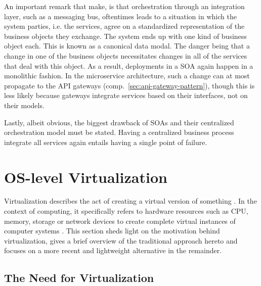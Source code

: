 An important remark that \citeauthor{cerny2018contextual} make, is that orchestration through an integration layer, such as a messaging bus, oftentimes leads to a situation in which the system parties, i.e. the services, agree on a standardized representation of the business objects they exchange. The system ends up with one kind of business object each. This is known as a canonical data modal. The danger being that a change in one of the business objects necessitates changes in all of the services that deal with this object. As a result, deployments in a \ac{SOA} again happen in a monolithic fashion. In the microservice architecture, such a change can at most propagate to the \acs{API} gateways (comp.~\autoref{sec:api-gateway-pattern}), though this is less likely because gateways integrate services based on their interfaces, not on their models.

Lastly, albeit obvious, the biggest drawback of \acp{SOA} and their centralized orchestration model must be stated. Having a centralized business process integrate all services again entails having a single point of failure.


\section{OS-level Virtualization}
\label{sec:os-level-virtualization}

Virtualization describes the act of creating a virtual version of something \cite[p.~2]{celesti2016exploring}. In the context of computing, it specifically refers to hardware resources such as \acs{CPU}, memory, storage or network devices to create complete virtual instances of computer systems \cite[p.~21]{da2018containers}. This section sheds light on the motivation behind virtualization, gives a brief overview of the traditional approach hereto and focuses on a more recent and lightweight alternative in the remainder.


\subsection{The Need for Virtualization}
\label{sec:virtualization-motivation}


